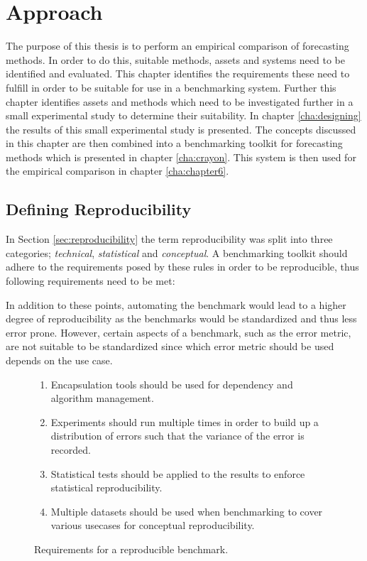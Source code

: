 \chapter{Approach}
\label{cha:approach}

The purpose of this thesis is to perform an empirical comparison of forecasting methods. In order to do this, suitable methods, assets and systems need to be identified and evaluated.
This chapter identifies the requirements these need to fulfill in order to be suitable for use in a benchmarking system. Further this chapter identifies assets and methods which need to be investigated further in a small experimental study to determine their suitability. In chapter \ref{cha:designing} the results of this small experimental study is presented. The concepts discussed in this chapter are then combined into a benchmarking toolkit for forecasting methods which is presented in chapter \ref{cha:crayon}. This system is then used for the empirical comparison in chapter \ref{cha:chapter6}.

\section{Defining Reproducibility}
In Section \ref{sec:reproducibility} the term reproducibility was split into three categories; \textit{technical}, \textit{statistical} and \textit{conceptual}. A benchmarking toolkit should adhere to the requirements posed by these rules in order to be reproducible, thus following requirements need to be met:

In addition to these points, automating the benchmark would lead to a higher degree of reproducibility as the benchmarks would be standardized and thus less error prone. However, certain aspects of a benchmark, such as the error metric, are not suitable to be standardized since which error metric should be used depends on the use case.

\begin{figure}[h]
  \begin{enumerate}
    \item Encapsulation tools should be used for dependency and algorithm management.
    \item Experiments should run multiple times in order to build up a distribution of errors such that the variance of the error is recorded.
    \item Statistical tests should be applied to the results to enforce statistical reproducibility.
    \item Multiple datasets should be used when benchmarking to cover various usecases for conceptual reproducibility.
  \end{enumerate}
  \caption{Requirements for a reproducible benchmark.}
  \label{fig:reproducibility_requirements}
\end{figure}

